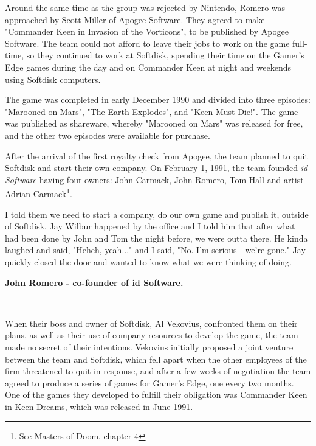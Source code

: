 \documentclass[book.tex]{subfiles}
\begin{document}
\label{sec:id_software}
Around the same time as the group was rejected by Nintendo, Romero was approached by Scott Miller of Apogee Software. They agreed to make "Commander Keen in Invasion of the Vorticons", to be published by Apogee Software. The team could not afford to leave their jobs to work on the game full-time, so they continued to work at Softdisk, spending their time on the Gamer's Edge games during the day and on Commander Keen at night and weekends using Softdisk computers.\\

\par
The game was completed in early December 1990 and divided into three episodes: "Marooned on Mars", "The Earth Explodes", and "Keen Must Die!". The game was published as shareware, whereby "Marooned on Mars" was released for free, and the other two episodes were available for purchase.\\

\par
After the arrival of the first royalty check from Apogee, the team planned to quit Softdisk and start their own company. On February 1, 1991, the team founded \textit{id Software} having four owners: John Carmack, John Romero, Tom Hall and artist Adrian Carmack\footnote{See Masters of Doom, chapter 4}. \\

\par
\begin{fancyquotes}
I told them we need to start a company, do our own game and publish it, outside of Softdisk. Jay Wilbur happened by the office and I told him that after what had been done by John and Tom the night before, we were outta there. He kinda laughed and said, "Heheh, yeah..." and I said, "No. I'm serious - we're gone." Jay quickly closed the door and wanted to know what we were thinking of doing.\\
\par
\textbf{John Romero - co-founder of id Software.}
\end{fancyquotes}\\

\bigskip
\par
When their boss and owner of Softdisk, Al Vekovius, confronted them on their plans, as well as their use of company resources to develop the game, the team made no secret of their intentions. Vekovius initially proposed a joint venture between the team and Softdisk, which fell apart when the other employees of the firm threatened to quit in response, and after a few weeks of negotiation the team agreed to produce a series of games for Gamer's Edge, one every two months. One of the games they developed to fulfill their obligation was Commander Keen in Keen Dreams, which was released in June 1991.\\
\end{document}
